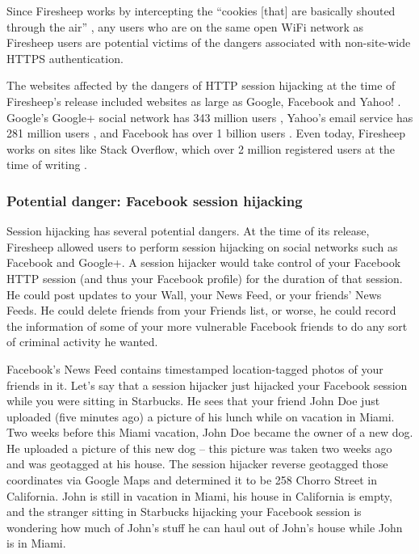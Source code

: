\documentclass[11pt]{article}
\begin{document}
\begin{multicols}{2}
Since Firesheep works by intercepting the ``cookies [that] are basically shouted through the air'' \cite{eric-butler}, any users who are on the same open WiFi network as Firesheep users are potential victims of the dangers associated with non-site-wide HTTPS authentication.

The websites affected by the dangers of HTTP session hijacking at the time of Firesheep's release included websites as large as Google, Facebook and Yahoo! \cite{firesheep-source}. Google's Google+ social network has 343 million users \cite{google-stats}, Yahoo's email service has 281 million users \cite{yahoo-stats}, and Facebook has over 1 billion users \cite{facebook-stats}. Even today, Firesheep works on sites like Stack Overflow, which over 2 million registered users at the time of writing \cite{stack-overflow-stats}.

\subsubsection*{Potential danger: Facebook session hijacking}
Session hijacking has several potential dangers. At the time of its release, Firesheep allowed users to perform session hijacking on social networks such as Facebook and Google+. A session hijacker would take control of your Facebook HTTP session (and thus your Facebook profile) for the duration of that session. He could post updates to your Wall, your News Feed, or your friends' News Feeds. He could delete friends from your Friends list, or worse, he could record the information of some of your more vulnerable Facebook friends to do any sort of criminal activity he wanted.	

Facebook's News Feed contains timestamped location-tagged photos of your friends in it. Let's say that a session hijacker just hijacked your Facebook session while you were sitting in Starbucks. He sees that your friend John Doe just uploaded (five minutes ago) a picture of his lunch while on vacation in Miami. Two weeks before this Miami vacation, John Doe became the owner of a new dog. He uploaded a picture of this new dog -- this picture was taken two weeks ago and was geotagged at his house. The session hijacker reverse geotagged those coordinates via Google Maps and determined it to be 258 Chorro Street in California. John is still in vacation in Miami, his house in California is empty, and the stranger sitting in Starbucks hijacking your Facebook session is wondering how much of John's stuff he can haul out of John's house while John is in Miami.


\end{multicols}
\end{document}

